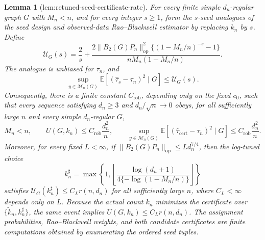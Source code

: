 \documentclass{article}
\newtheorem{lemma}{Lemma}
\begin{document}
\begin{lemma}[lem:retuned-seed-certificate-rate]\label{lem:retuned-seed-certificate-rate}
For every finite simple \(d_n\)-regular graph \(G\) with \(M_n<n\), and for every integer \(s\ge1\), form the \(s\)-seed analogues of the seed design and observed-data Rao--Blackwell estimator by replacing \(k_n\) by \(s\).  Define
\[
\mathcal U_G(s)=\frac{2}{s}+
\frac{2\|B_2(G)P_n\|_{\mathrm{op}}^2\{(1-M_n/n)^{-s}-1\}}
{nM_n(1-M_n/n)}.
\]
The analogue is unbiased for \(\tau_n\), and
\[
\sup_{y\in\mathcal M_n(G)}
\mathbb E\!\left[(\widehat\tau_s-\tau_n)^2\mid G\right]
\le \mathcal U_G(s).
\]
Consequently, there is a finite constant \(C_{\mathrm{rob}}\), depending only on the fixed \(c_0\), such that every sequence satisfying \(d_n\ge3\) and \(d_n/\sqrt n\to0\) obeys, for all sufficiently large \(n\) and every simple \(d_n\)-regular \(G\),
\[
M_n<n,
\qquad
U(G,k_n)\le C_{\mathrm{rob}}\frac{d_n^2}{n},
\qquad
\sup_{y\in\mathcal M_n(G)}
\mathbb E\!\left[(\widehat\tau_{\mathrm{cert}}-\tau_n)^2\mid G\right]
\le C_{\mathrm{rob}}\frac{d_n^2}{n}.
\]
Moreover, for every fixed \(L<\infty\), if
\(\|B_2(G)P_n\|_{\mathrm{op}}\le Ld_n^{7/4}\), then the log-tuned choice
\[
k_n^\sharp=\max\!\left\{1,\left\lfloor
\frac{\log(d_n+1)}{4\{-\log(1-M_n/n)\}}
\right\rfloor\right\}
\]
satisfies \(\mathcal U_G(k_n^\sharp)\le C_L r(n,d_n)\) for all sufficiently large \(n\), where \(C_L<\infty\) depends only on \(L\).  Because the actual count \(k_n\) minimizes the certificate over \(\{\widetilde k_n,k_n^\sharp\}\), the same event implies \(U(G,k_n)\le C_Lr(n,d_n)\).  The assignment probabilities, Rao--Blackwell weights, and both candidate certificates are finite computations obtained by enumerating the ordered seed tuples.
\end{lemma}
\end{document}
